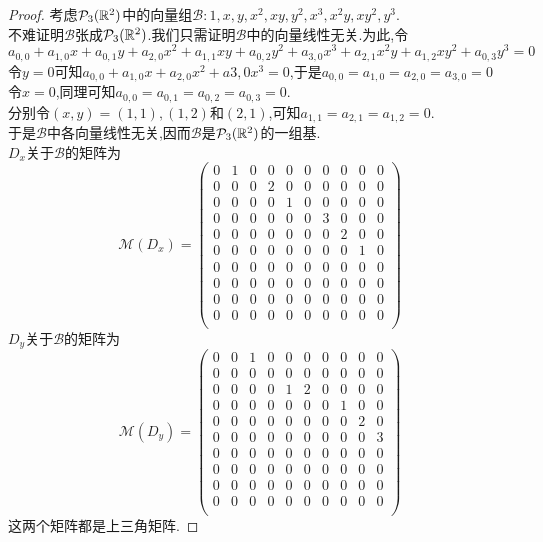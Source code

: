 \documentclass{ctexart}
\begin{document}
\begin{proof}
    考虑$\mathcal{P}_3(\mathbb{R}^2)$中的向量组$\mathcal{B}:1,x,y,x^2,xy,y^2,x^3,x^2y,xy^2,y^3$.\\
    不难证明$\mathcal{B}$张成$\mathcal{P}_3(\mathbb{R}^2)$.我们只需证明$\mathcal{B}$中的向量线性无关.为此,令
    \[a_{0,0}+a_{1,0}x+a_{0,1}y+a_{2,0}x^2+a_{1,1}xy+a_{0,2}y^2+a_{3,0}x^3+a_{2,1}x^2y+a_{1,2}xy^2+a_{0,3}y^3=0\]
    令$y=0$可知$a_{0,0}+a_{1,0}x+a_{2,0}x^2+a{3,0}x^3=0$,于是$a_{0,0}=a_{1,0}=a_{2,0}=a_{3,0}=0$\\
    令$x=0$,同理可知$a_{0,0}=a_{0,1}=a_{0,2}=a_{0,3}=0$.\\
    分别令$(x,y)=(1,1),(1,2)$和$(2,1)$,可知$a_{1,1}=a_{2,1}=a_{1,2}=0$.\\
    于是$\mathcal{B}$中各向量线性无关,因而$\mathcal{B}$是$\mathcal{P}_3(\mathbb{R}^2)$的一组基.\\
    $D_x$关于$\mathcal{B}$的矩阵为
    \[\mathcal{M}(D_x)=\begin{pmatrix}
        0&1&0&0&0&0&0&0&0&0\\
        0&0&0&2&0&0&0&0&0&0\\
        0&0&0&0&1&0&0&0&0&0\\
        0&0&0&0&0&0&3&0&0&0\\
        0&0&0&0&0&0&0&2&0&0\\
        0&0&0&0&0&0&0&0&1&0\\
        0&0&0&0&0&0&0&0&0&0\\
        0&0&0&0&0&0&0&0&0&0\\
        0&0&0&0&0&0&0&0&0&0\\
        0&0&0&0&0&0&0&0&0&0\\
    \end{pmatrix}\]
    $D_y$关于$\mathcal{B}$的矩阵为
    \[\mathcal{M}(D_y)=\begin{pmatrix}
        0&0&1&0&0&0&0&0&0&0\\
        0&0&0&0&0&0&0&0&0&0\\
        0&0&0&0&1&2&0&0&0&0\\
        0&0&0&0&0&0&0&1&0&0\\
        0&0&0&0&0&0&0&0&2&0\\
        0&0&0&0&0&0&0&0&0&3\\
        0&0&0&0&0&0&0&0&0&0\\
        0&0&0&0&0&0&0&0&0&0\\
        0&0&0&0&0&0&0&0&0&0\\
        0&0&0&0&0&0&0&0&0&0\\
    \end{pmatrix}\]
    这两个矩阵都是上三角矩阵.
\end{proof}
\end{document}
